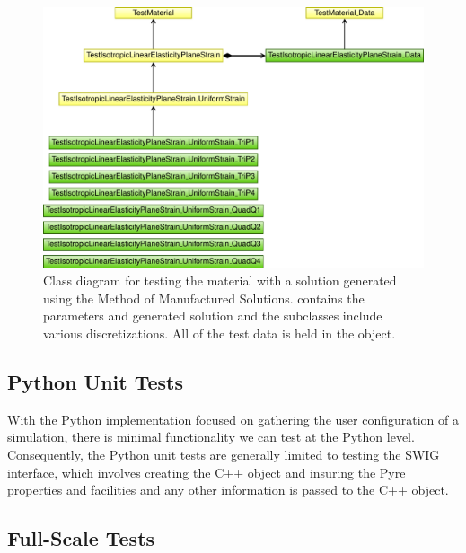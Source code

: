 \begin{figure}[htbp]
  \includegraphics[scale=0.8]{developer/figs/testmaterial_classdiagram}
  \caption{Class diagram for testing the
     material with a
    solution generated using the Method of Manufactured
    Solutions. 
    contains the parameters and generated solution and the subclasses
    include various discretizations. All of the test data is held in
    the 
    object.}
  \label{fig:developer:test:material:class}
\end{figure}


\subsection{Python Unit Tests}

With the Python implementation focused on gathering the user configuration of a simulation, there is
minimal functionality we can test at the Python level. Consequently, the Python unit tests are generally
limited to testing the SWIG interface, which involves creating the C++ object and insuring the Pyre
properties and facilities and any other information is passed to the C++ object.

\subsection{Full-Scale Tests}



